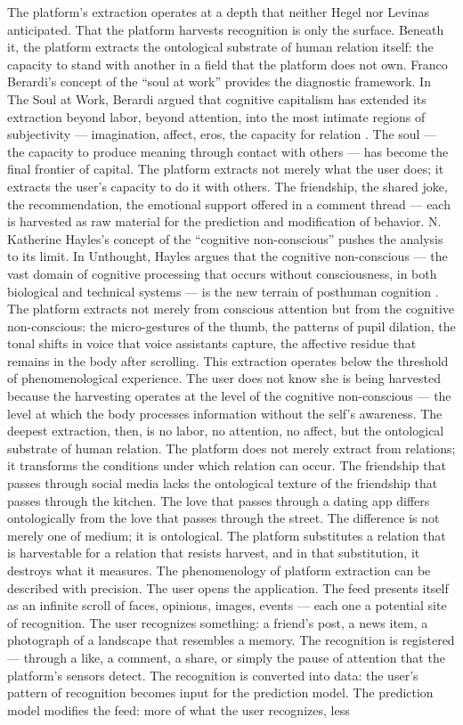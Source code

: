 The platform's extraction operates at a depth that neither Hegel nor Levinas anticipated. That the platform harvests recognition is only the surface. Beneath it, the platform extracts the ontological substrate of human relation itself: the capacity to stand with another in a field that the platform does not own. Franco Berardi’s concept of the “soul at work” provides the diagnostic framework. In The Soul at Work, Berardi argued that cognitive capitalism has extended its extraction beyond labor, beyond attention, into the most intimate regions of subjectivity — imagination, affect, eros, the capacity for relation \cite[pp.~19--42]{berardi_2009}. The soul — the capacity to produce meaning through contact with others — has become the final frontier of capital. The platform extracts not merely what the user does; it extracts the user’s capacity to do it with others. The friendship, the shared joke, the recommendation, the emotional support offered in a comment thread — each is harvested as raw material for the prediction and modification of behavior. N. Katherine Hayles’s concept of the “cognitive non-conscious” pushes the analysis to its limit. In Unthought, Hayles argues that the cognitive non-conscious — the vast domain of cognitive processing that occurs without consciousness, in both biological and technical systems — is the new terrain of posthuman cognition \cite[pp.~29--58]{hayles_2017}. The platform extracts not merely from conscious attention but from the cognitive non-conscious: the micro-gestures of the thumb, the patterns of pupil dilation, the tonal shifts in voice that voice assistants capture, the affective residue that remains in the body after scrolling. This extraction operates below the threshold of phenomenological experience. The user does not know she is being harvested because the harvesting operates at the level of the cognitive non-conscious — the level at which the body processes information without the self’s awareness. The deepest extraction, then, is no labor, no attention, no affect, but the ontological substrate of human relation. The platform does not merely extract from relations; it transforms the conditions under which relation can occur. The friendship that passes through social media lacks the ontological texture of the friendship that passes through the kitchen. The love that passes through a dating app differs ontologically from the love that passes through the street. The difference is not merely one of medium; it is ontological. The platform substitutes a relation that is harvestable for a relation that resists harvest, and in that substitution, it destroys what it measures. The phenomenology of platform extraction can be described with precision. The user opens the application. The feed presents itself as an infinite scroll of faces, opinions, images, events — each one a potential site of recognition. The user recognizes something: a friend’s post, a news item, a photograph of a landscape that resembles a memory. The recognition is registered — through a like, a comment, a share, or simply the pause of attention that the platform’s sensors detect. The recognition is converted into data: the user’s pattern of recognition becomes input for the prediction model. The prediction model modifies the feed: more of what the user recognizes, less 